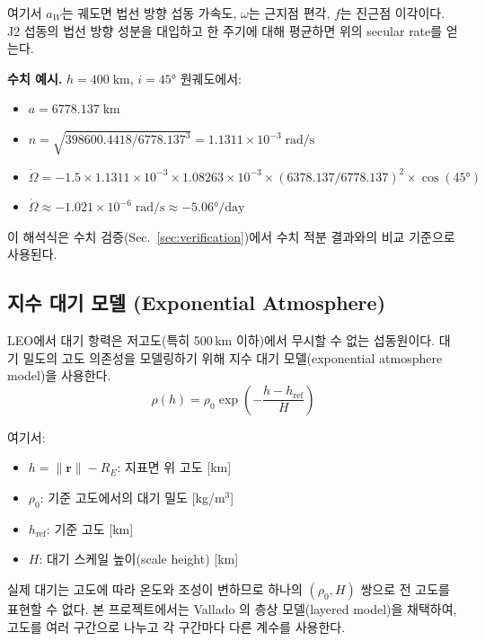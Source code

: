 \documentclass[11pt]{article}
\begin{document}
여기서 $a_W$는 궤도면 법선 방향 섭동 가속도, $\omega$는 근지점 편각, $f$는 진근점 이각이다. J2 섭동의 법선 방향 성분을 대입하고 한 주기에 대해 평균하면 위의 secular rate를 얻는다.

\textbf{수치 예시.} $h = 400\;\text{km}$, $i = 45°$ 원궤도에서:
\begin{itemize}
  \item $a = 6778.137\;\text{km}$
  \item $n = \sqrt{398600.4418 / 6778.137^3} = 1.1311 \times 10^{-3}\;\text{rad/s}$
  \item $\dot{\Omega} = -1.5 \times 1.1311 \times 10^{-3} \times 1.08263 \times 10^{-3} \times (6378.137/6778.137)^2 \times \cos(45°)$
  \item $\dot{\Omega} \approx -1.021 \times 10^{-6}\;\text{rad/s} \approx -5.06°/\text{day}$
\end{itemize}

이 해석식은 수치 검증(Sec.~\ref{sec:verification})에서 수치 적분 결과와의 비교 기준으로 사용된다.


\subsection{지수 대기 모델 (Exponential Atmosphere)}

LEO에서 대기 항력은 저고도(특히 500\,km 이하)에서 무시할 수 없는 섭동원이다. 대기 밀도의 고도 의존성을 모델링하기 위해 지수 대기 모델(exponential atmosphere model)을 사용한다.
\[
\rho(h) = \rho_0 \exp\!\left(-\frac{h - h_{\text{ref}}}{H}\right)
\]

여기서:
\begin{itemize}
  \item $h = \|\mathbf{r}\| - R_E$: 지표면 위 고도 [km]
  \item $\rho_0$: 기준 고도에서의 대기 밀도 [kg/m$^3$]
  \item $h_{\text{ref}}$: 기준 고도 [km]
  \item $H$: 대기 스케일 높이(scale height) [km]
\end{itemize}

실제 대기는 고도에 따라 온도와 조성이 변하므로 하나의 $(\rho_0, H)$ 쌍으로 전 고도를 표현할 수 없다. 본 프로젝트에서는 Vallado \cite{Vallado2013}의 층상 모델(layered model)을 채택하여, 고도를 여러 구간으로 나누고 각 구간마다 다른 계수를 사용한다.
\end{document}
